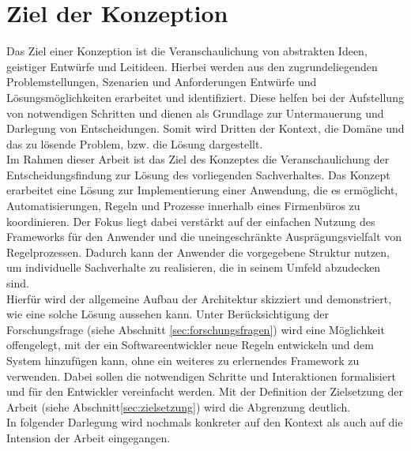 \section{Ziel der Konzeption}
\label{sec:konzeptziele}
    Das Ziel einer Konzeption ist die Veranschaulichung von abstrakten Ideen, geistiger Entwürfe und Leitideen. 
    Hierbei werden aus den zugrundeliegenden Problemstellungen, Szenarien und Anforderungen Entwürfe und 
    Lösungsmöglichkeiten erarbeitet und identifiziert. Diese helfen bei der Aufstellung von notwendigen Schritten 
    und dienen als Grundlage zur Untermauerung und Darlegung von Entscheidungen. Somit wird Dritten der Kontext, die 
    Domäne und das zu lösende Problem, bzw. die Lösung dargestellt. 
    \\
    \linebreak
    Im Rahmen dieser Arbeit ist das Ziel des Konzeptes die Veranschaulichung der Entscheidungsfindung zur Lösung des vorliegenden 
    Sachverhaltes. Das Konzept 
    erarbeitet eine Lösung zur Implementierung einer Anwendung, die es ermöglicht, Automatisierungen, Regeln und Prozesse innerhalb eines 
    Firmenbüros zu koordinieren. Der Fokus liegt dabei verstärkt auf der einfachen Nutzung des Frameworks für den Anwender und 
    die uneingeschränkte Ausprägungsvielfalt von Regelprozessen. Dadurch kann der Anwender die vorgegebene Struktur nutzen, um individuelle 
    Sachverhalte zu realisieren, die in seinem Umfeld abzudecken sind.
    \\
    Hierfür wird der allgemeine Aufbau der Architektur skizziert und demonstriert, wie eine solche Lösung aussehen kann. 
    Unter Berücksichtigung der Forschungsfrage (siehe Abschnitt \ref{sec:forschungsfragen}) wird eine Möglichkeit offengelegt, mit der 
    ein Softwareentwickler neue Regeln entwickeln und dem System hinzufügen kann, ohne ein weiteres zu erlernendes Framework zu verwenden. 
    Dabei sollen die notwendigen Schritte und Interaktionen formalisiert und für den Entwickler vereinfacht werden. Mit der 
    Definition der Zielsetzung der Arbeit (siehe Abschnitt\ref{sec:zielsetzung}) wird die Abgrenzung deutlich. 
    \\
    \linebreak
    In folgender Darlegung %
    wird nochmals konkreter auf den Kontext als auch auf die Intension der Arbeit eingegangen. 

